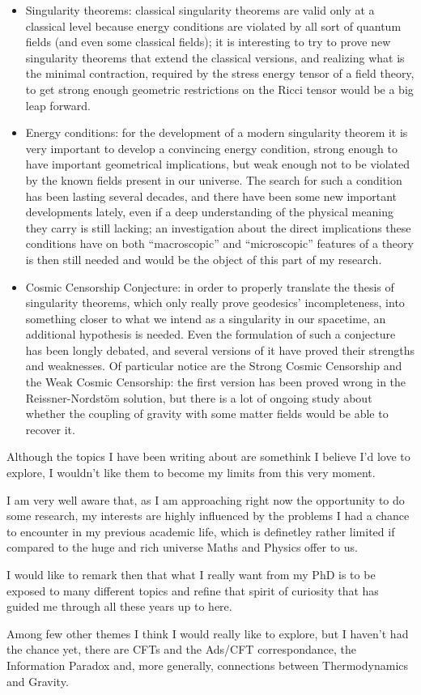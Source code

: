 \documentclass[12pt, a4paper]{article}
\begin{document}
\begin{itemize}
	\item Singularity theorems: classical singularity theorems are valid only at a classical level because energy conditions are violated by all sort of quantum fields (and even some classical fields); it is interesting to try to prove new singularity theorems that extend the classical versions, and realizing what is the minimal contraction, required by the stress energy tensor of a field theory, to get strong enough geometric restrictions on the Ricci tensor would be a big leap forward.
	\item Energy conditions: for the development of a modern singularity theorem it is very important to develop a convincing energy condition, strong enough to have important geometrical implications, but weak enough not to be violated by the known fields present in our universe. The search for such a condition has been lasting several decades, and there have been some new important developments lately, even if a deep understanding of the physical meaning they carry is still lacking; an investigation about the direct implications these conditions have on both ``macroscopic'' and ``microscopic'' features of a theory is then still needed and would be the object of this part of my research.
	\item Cosmic Censorship Conjecture: in order to properly translate the thesis of singularity theorems, which only really prove geodesics' incompleteness, into something closer to what we intend as a singularity in our spacetime, an additional hypothesis is needed. Even the formulation of such a conjecture has been longly debated, and several versions of it have proved their strengths and weaknesses. Of particular notice are the Strong Cosmic Censorship and the Weak Cosmic Censorship: the first version has been proved wrong in the Reissner-Nordst\"om solution, but there is a lot of ongoing study about whether the coupling of gravity with some matter fields would be able to recover it. 
\end{itemize}

Although the topics I have been writing about are somethink I believe I'd love to explore, I wouldn't like them to become my limits from this very moment.

I am very well aware that, as I am approaching right now the opportunity to do some research, my interests are highly influenced by the problems I had a chance to encounter in my previous academic life, which is definetley rather limited if compared to the huge and rich universe Maths and Physics offer to us.

I would like to remark then that what I really want from my PhD is to be exposed to many different topics and refine that spirit of curiosity that has guided me through all these years up to here.

Among few other themes I think I would really like to explore, but I haven't had the chance yet, there are CFTs and the Ads/CFT correspondance, the Information Paradox and, more generally, connections between Thermodynamics and Gravity.
\end{document}
